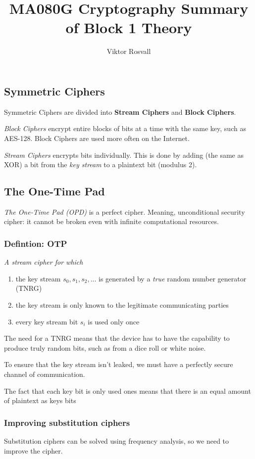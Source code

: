 \documentclass{article}
\title{MA080G Cryptography Summary of Block 1 Theory}
\author{Viktor Rosvall}
\begin{document}
	\maketitle
	
	\subsection*{Symmetric Ciphers}
	Symmetric Ciphers are divided into \textbf{Stream Ciphers} and \textbf{Block Ciphers}.
	
	\textit{Block Ciphers} encrypt entire blocks of bits at a time with the same key, such as AES-128. Block Ciphers are used more often on the Internet.
	
	\textit{Stream Ciphers} encrypts bits individually. This is done by adding (the same as XOR) a bit from the \textit{key stream} to a plaintext bit (modulus 2). 
	

	\subsection*{The One-Time Pad}
	\textit{The One-Time Pad (OPD)} is a perfect cipher. Meaning, unconditional security cipher: it cannot be broken even with infinite computational resources.
	
	\subsubsection*{Defintion: OTP}
	\textit{A stream cipher for which}
	\begin{enumerate}
		\item the key stream $s_0,s_1,s_2,...$ is generated by a \textit{true} random number generator (TNRG)
		\item the key stream is only known to the legitimate communicating parties
		\item every key stream bit $s_i$ is used only once
	\end{enumerate} 
	
	The need for a TNRG means that the device has to have the capability to produce truly random bits, such as from a dice roll or white noise. 
	
	To ensure that the key stream isn't leaked, we must have a perfectly secure channel of communication.
	
	The fact that each key bit is only used ones means that there is an equal amount of plaintext as keys bits
	
	\subsubsection*{Improving substitution ciphers}
	Substitution ciphers can be solved using frequency analysis, so we need to improve the cipher.
	
\end{document}
